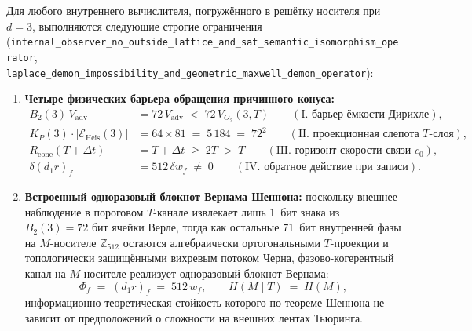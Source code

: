 \begin{theorem}
\label{thm:mono-internal-barriers-vernam}
Для любого внутреннего вычислителя, погружённого в решётку носителя при $d = 3$, выполняются следующие строгие ограничения (\texttt{internal\_\allowbreak observer\_\allowbreak no\_\allowbreak outside\_\allowbreak lattice\_\allowbreak and\_\allowbreak sat\_\allowbreak semantic\_\allowbreak isomorphism\_\allowbreak operator}, \texttt{laplace\_\allowbreak demon\_\allowbreak impossibility\_\allowbreak and\_\allowbreak geometric\_\allowbreak maxwell\_\allowbreak demon\_\allowbreak operator}):
\begin{enumerate}[label=\textbf{\arabic*.},noitemsep]
\item \textbf{Четыре физических барьера обращения причинного конуса:}
  \begin{align}
    B_2(3)\,V_{\mathrm{adv}} &= 72\,V_{\mathrm{adv}} \;<\; 72\,V_{O_2}(3, T) \qquad (\text{I. барьер ёмкости Дирихле}), \label{eq:mono-barrier-dirichlet} \\
    K_P(3)\cdot |\mathcal{E}_{\mathrm{Heis}}(3)| &= 64 \times 81 \;=\; 5\,184 \;=\; 72^2 \qquad (\text{II. проекционная слепота } T\text{-слоя}), \label{eq:mono-barrier-blindness} \\
    R_{\mathrm{cone}}(T + \Delta t) &= T + \Delta t \;\ge\; 2T \;>\; T \qquad (\text{III. горизонт скорости связи } c_0), \label{eq:mono-barrier-horizon} \\
    \delta(d_1 r)_f &= 512\,\delta w_f \;\ne\; 0 \qquad (\text{IV. обратное действие при записи}). \label{eq:mono-barrier-backaction}
  \end{align}
\item \textbf{Встроенный одноразовый блокнот Вернама Шеннона:}
  поскольку внешнее наблюдение в пороговом $T$-канале извлекает лишь $1$~бит знака из $B_2(3) = 72$ бит ячейки Верле, тогда как остальные $71$~бит внутренней фазы на $M$-носителе $\mathbb{Z}_{512}$ остаются алгебраически ортогональными $T$-проекции и топологически защищёнными вихревым потоком Черна, фазово-когерентный канал на $M$-носителе реализует одноразовый блокнот Вернама:
  \begin{equation}
    \label{eq:mono-vernam-entropy}
    \Phi_f \;=\; (d_1 r)_f \;=\; 512\,w_f, \qquad
    H(M \mid T) \;=\; H(M),
  \end{equation}
  информационно-теоретическая стойкость которого по теореме Шеннона не зависит от предположений о сложности на внешних лентах Тьюринга.
\end{enumerate}
\end{theorem}

